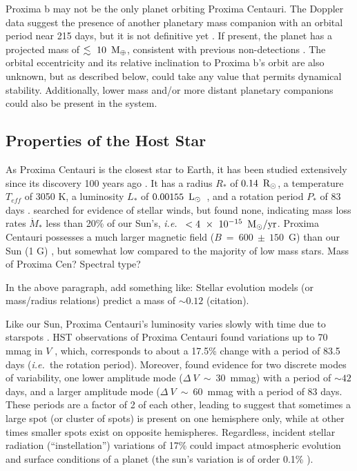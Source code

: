 \documentclass[preprint,12pt]{aastex}
\newcommand{\xxx}[1]{{\color{red} #1}} %
\newcommand{\xxx}[1]{{\color{red} #1}} %
\def\mearth{{\rm\,M_\oplus}}
\def\msun{{\rm\,M_\odot}}
\def\rsun{{\rm\,R_\odot}}
\def\lsun{{\rm\,L_\odot}}
\def\ie{{\it i.e.\ }}
\begin{document}
Proxima b may not be the only planet orbiting Proxima
Centauri. The Doppler data suggest the presence of another planetary
mass companion with an orbital period near 215 days, but it is not
definitive yet \citep{AngladaEscude16}. If present, the planet has a
projected mass of $\lesssim~10~\mearth$, consistent with previous
non-detections \citep{EndlKurster08,Barnes14,Lurie14}. The orbital
eccentricity and its relative inclination to Proxima b's orbit are also
unknown, but as described below, could take any value that permits
dynamical stability. Additionally, lower mass and/or more distant
planetary companions could also be present in the system.

\subsection{Properties of the Host Star}
\label{sec:obs:star}
As Proxima Centauri is the closest star to Earth, it has been studied
extensively since its discovery 100 years ago \citep{Innes1915}.  It
has a radius $R_*$ of $0.14~\rsun$, a temperature $T_{eff}$ of 3050 K, a
luminosity $L_*$ of $0.00155~\lsun$~\citep{Boyajian12}, and a rotation
period $P_*$ of 83 days \citep{Benedict98}. \cite{Wood01} searched for
evidence of stellar winds, but found none, indicating mass loss rates
$\dot{M}_*$ less than 20\% of our Sun's, \ie
$<4~\times~10^{-15}~\msun/\textrm{yr}$. Proxima Centauri possesses a
much larger magnetic field ($B~=~600~\pm~150$~G) than our Sun (1 G)
\citep{ReinersBasri08}, but somewhat low compared to the majority of
low mass stars. \xxx{Mass of Proxima Cen? Spectral type?}

\xxx{In the above paragraph, add something like: Stellar evolution models (or mass/radius relations)
predict a mass of $\sim 0.12$ (citation).}

Like our Sun, Proxima Centauri's luminosity varies slowly with time
due to starspots \citep{Benedict93}. HST observations of Proxima
Centauri found variations up to 70 mmag in $V$ \citep{Benedict98},
which, corresponds to about a 17.5\% change with a period of 83.5 days
(\ie the rotation period). Moreover, \citep{Benedict98} found evidence
for two discrete modes of variability, one lower amplitude mode
($\Delta~V~\sim~30$~mmag) with a period of $\sim 42$ days, and a
larger amplitude mode ($\Delta~V~\sim~60$~mmag with a period of 83
days. These periods are a factor of 2 of each other, leading
\cite{Benedict98} to suggest that sometimes a large spot (or cluster
of spots) is present on one hemisphere only, while at other times
smaller spots exist on opposite hemispheres. Regardless, incident
stellar radiation (``instellation'') variations of 17\% could impact
atmospheric evolution and surface conditions of a planet (the sun's
variation is of order 0.1\% \citep{Willson81}).
\end{document}
